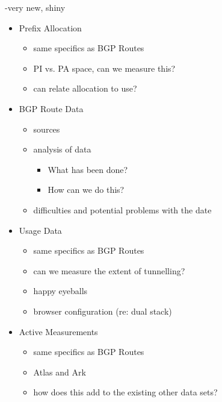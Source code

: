 -very new, shiny

\begin{itemize}
    \item Prefix Allocation
    \begin{itemize}
        \item same specifics as BGP Routes
        \item PI vs. PA space, can we measure this?
        \item can relate allocation to use?
    \end{itemize}
    \item BGP Route Data
    \begin{itemize}
        \item sources
        \item analysis of data
        \begin{itemize}
            \item What has been done?
            \item How can we do this?
        \end{itemize}
        \item difficulties and potential problems with the date
    \end{itemize}
    \item Usage Data
    \begin{itemize}
        \item same specifics as BGP Routes
        \item can we measure the extent of tunnelling?
        \item happy eyeballs
        \item browser configuration (re: dual stack)
    \end{itemize}
    \item Active Measurements
    \begin{itemize}
        \item same specifics as BGP Routes
        \item Atlas and Ark
        \item how does this add to the existing other data sets?
    \end{itemize}
\end{itemize}
